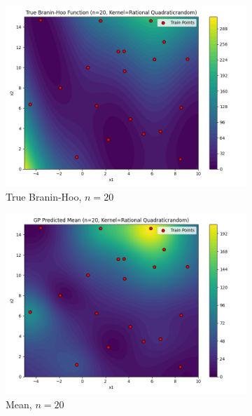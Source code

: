 \documentclass[a4paper,12pt]{article}
\begin{document}
\begin{figure}[H]
\begin{subfigure}{0.3\textwidth}
  \includegraphics[width=\linewidth]{Task-02/images/true_function_rational_quadratic_n20_random.png}
  \caption{True Branin-Hoo, $n=20$}
\end{subfigure}
\begin{subfigure}{0.3\textwidth}
    \includegraphics[width=\linewidth]{Task-02/images/gp_mean_rational_quadratic_n20_random.png}
    \caption{Mean, $n=20$}
\end{subfigure}
\begin{subfigure}{0.3\textwidth}

\end{subfigure}
\end{figure}
\end{document}
